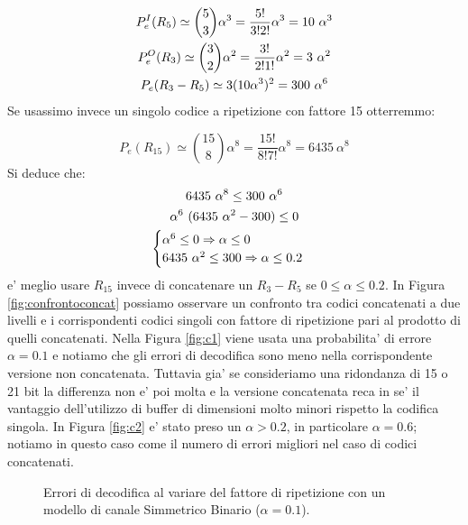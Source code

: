 \documentclass[a4paper,11pt]{article}
\theoremstyle{definition}
\begin{document}
\begin{gather}
P_e^I(R_5) \simeq \binom{5}{3} \alpha^3 = \frac{5!}{3!2!} \alpha^3 = 10 \ \alpha^3 \notag \\
P_e^O(R_3) \simeq \binom{3}{2} \alpha^2 = \frac{3!}{2!1!} \alpha^2 = 3 \ \alpha^2 \notag \\
P_e(R_3-R_5) \simeq 3 (10 \alpha^3)^2 = 300 \ \alpha^6
\end{gather}
Se usassimo invece un singolo codice a ripetizione con fattore 15 otterremmo:

\begin{equation}
P_e(R_{15}) \simeq \binom{15}{8} \alpha^8 = \frac{15!}{8!7!} \alpha^8 = 6435 \ \alpha^8
\end{equation}
Si deduce che:
\begin{gather}
6435 \ \alpha^8 \leq 300 \ \alpha^6 \notag \\
\alpha^6 \ (6435 \ \alpha^2 - 300 ) \leq 0  \notag \\
\begin{cases}
\alpha^6 \leq 0 \Rightarrow \alpha \leq 0 \\
6435 \ \alpha^2 \leq 300 \Rightarrow \alpha \leq 0.2
\end{cases}
\end{gather}
e' meglio usare $R_{15}$ invece di concatenare un $R_3-R_5$ se $0 \leq \alpha \leq 0.2$. 
In Figura \ref{fig:confrontoconcat} possiamo osservare un confronto tra codici concatenati a due livelli e i corrispondenti codici singoli con fattore di ripetizione pari al prodotto di quelli concatenati. Nella Figura \ref{fig:c1} viene usata una probabilita' di errore $\alpha=0.1$ e notiamo che gli errori di decodifica sono meno nella corrispondente versione non concatenata. Tuttavia gia' se consideriamo una ridondanza di 15 o 21 bit la differenza non e' poi molta e la versione concatenata reca in se' il vantaggio dell'utilizzo di buffer di dimensioni molto minori rispetto la codifica singola. In Figura \ref{fig:c2} e' stato preso un $\alpha>0.2$, in particolare $\alpha=0.6$; notiamo in questo caso come il numero di errori migliori nel caso di codici concatenati.
\begin{figure}
	\centering
	  \quad
	\caption{Errori di decodifica al variare del fattore di ripetizione con un modello di canale Simmetrico Binario ($\alpha=0.1$).}
	\label{fig:erroririp}
\end{figure}
\end{document}
